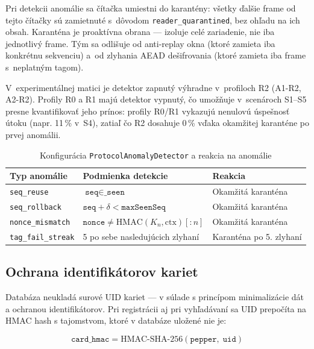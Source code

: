 \documentclass[journal,a4paper,onecolumn]{IEEEtran}
\begin{document}
Pri detekcii anomálie sa čítačka umiestni do karantény: všetky ďalšie frame od tejto čítačky sú zamietnuté s~dôvodom \texttt{reader\_quarantined}, bez ohľadu na ich obsah. Karanténa je proaktívna obrana --- izoluje celé zariadenie, nie iba jednotlivý frame. Tým sa odlišuje od anti-replay okna (ktoré zamieta iba konkrétnu sekvenciu) a~od zlyhania AEAD dešifrovania (ktoré zamieta iba frame s~neplatným tagom).

V~experimentálnej matici je detektor zapnutý výhradne v~profiloch R2 (A1-R2, A2-R2). Profily R0 a R1 majú detektor vypnutý, čo umožňuje v~scenároch S1--S5 presne kvantifikovať jeho prínos: profily R0/R1 vykazujú nenulovú úspešnosť útoku (napr. 11\,\% v~S4), zatiaľ čo R2 dosahuje 0\,\% vďaka okamžitej karanténe po prvej anomálii.

\begin{table}[htbp]
\renewcommand{\arraystretch}{1.3}
\centering
\caption{Konfigurácia \texttt{ProtocolAnomalyDetector} a reakcia na anomálie}
\label{tab:anomaly-config}
\begin{tabular}{l l l}
\toprule
\textbf{Typ anomálie} & \textbf{Podmienka detekcie} & \textbf{Reakcia} \\
\midrule
\texttt{seq\_reuse} & $\texttt{seq} \in \texttt{\_seen}$ & Okamžitá karanténa \\
\texttt{seq\_rollback} & $\texttt{seq} + \delta < \texttt{maxSeenSeq}$ & Okamžitá karanténa \\
\texttt{nonce\_mismatch} & $\texttt{nonce} \neq \text{HMAC}(K_n, \text{ctx})[:n]$ & Okamžitá karanténa \\
\texttt{tag\_fail\_streak} & 5 po sebe nasledujúcich zlyhaní & Karanténa po 5. zlyhaní \\
\bottomrule
\end{tabular}
\end{table}

\subsection{Ochrana identifikátorov kariet}

Databáza neukladá surové UID kariet --- v súlade s princípom minimalizácie dát\cite{ISO27001} a ochranou identifikátorov\cite{NIST80063B4}. Pri registrácii aj pri vyhľadávaní sa UID prepočíta na HMAC hash s tajomstvom, ktoré v databáze uložené nie je:

\begin{equation}
\texttt{card\_hmac} = \mathrm{HMAC\text{-}SHA\text{-}256}(\texttt{pepper},\; \texttt{uid})
\end{equation}
\end{document}
